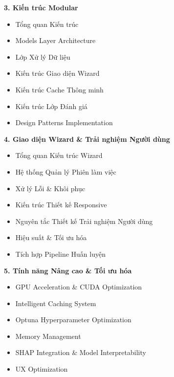 \documentclass[a4paper,12pt]{article}
\begin{document}
\vspace{0.5em}
\noindent
\textbf{3. Kiến trúc Modular} \dotfill \pageref{sec:modular-architecture}
\begin{itemize}
    \item Tổng quan Kiến trúc \dotfill \pageref{subsec:architecture-overview}
    \item Models Layer Architecture \dotfill \pageref{subsec:models-layer}
    \item Lớp Xử lý Dữ liệu \dotfill \pageref{subsec:data-processing}
    \item Kiến trúc Giao diện Wizard \dotfill \pageref{subsec:wizard-integration}
    \item Kiến trúc Cache Thông minh \dotfill \pageref{subsec:caching-architecture}
    \item Kiến trúc Lớp Đánh giá \dotfill \pageref{subsec:evaluation-architecture}
    \item Design Patterns Implementation \dotfill \pageref{subsec:design-patterns}
\end{itemize}

\vspace{0.5em}
\noindent
\textbf{4. Giao diện Wizard \& Trải nghiệm Người dùng} \dotfill \pageref{sec:wizard-interface}
\begin{itemize}
    \item Tổng quan Kiến trúc Wizard \dotfill \pageref{subsec:wizard-overview}
    \item Hệ thống Quản lý Phiên làm việc \dotfill \pageref{subsec:session-management}
    \item Xử lý Lỗi \& Khôi phục \dotfill \pageref{subsec:error-handling}
    \item Kiến trúc Thiết kế Responsive \dotfill \pageref{subsec:responsive-design}
    \item Nguyên tắc Thiết kế Trải nghiệm Người dùng \dotfill \pageref{subsec:ux-principles}
    \item Hiệu suất \& Tối ưu hóa \dotfill \pageref{subsec:wizard-optimization}
    \item Tích hợp Pipeline Huấn luyện \dotfill \pageref{subsec:training-integration}
\end{itemize}

\vspace{0.5em}
\noindent
\textbf{5. Tính năng Nâng cao \& Tối ưu hóa} \dotfill \pageref{sec:advanced-features}
\begin{itemize}
    \item GPU Acceleration \& CUDA Optimization \dotfill \pageref{subsec:pipeline-optimization}
    \item Intelligent Caching System \dotfill \pageref{subsec:intelligent-caching}
    \item Optuna Hyperparameter Optimization \dotfill \pageref{subsec:optuna-optimization}
    \item Memory Management \dotfill \pageref{subsec:memory-management}
    \item SHAP Integration \& Model Interpretability \dotfill \pageref{subsec:shap-integration}
    \item UX Optimization \dotfill \pageref{subsec:ux-optimization}
\end{itemize}
\end{document}
